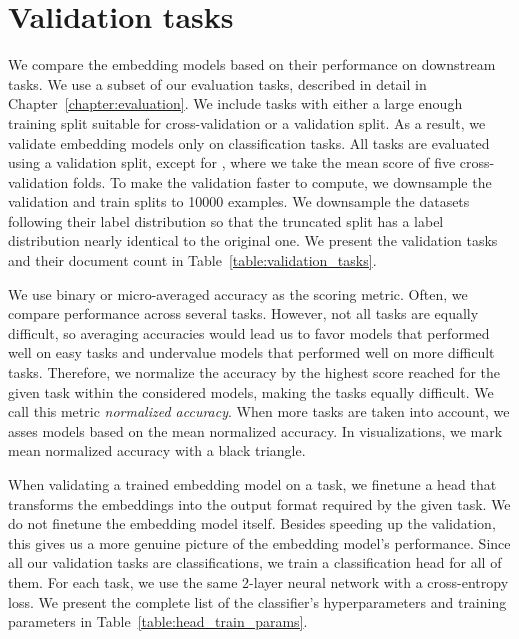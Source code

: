 \section{Validation tasks}\label{section:validation_tasks}

We compare the embedding models based on their performance on downstream tasks.
We use a subset of our evaluation tasks, described in detail in
Chapter~\ref{chapter:evaluation}. We include tasks with either a large enough
training split suitable for cross-validation or a validation split. As a
result, we validate embedding models only on classification tasks. All tasks
are evaluated using a validation split, except for , where we take
the mean score of five cross-validation folds. To make the validation faster to
compute, we downsample the validation and train splits to 10000 examples. We
downsample the datasets following their label distribution so that the
truncated split has a label distribution nearly identical to the original one.
We present the validation tasks and their document count in
Table~\ref{table:validation_tasks}.

We use binary or micro-averaged accuracy as the scoring metric. Often, we compare
performance across several tasks. However, not all tasks are equally difficult,
so averaging accuracies would lead us to favor models that performed well on
easy tasks and undervalue models that performed well on more difficult tasks.
Therefore, we normalize the accuracy by the highest score reached for the given
task within the considered models, making the tasks equally difficult. We call
this metric \emph{normalized accuracy}. When more tasks are taken into account,
we asses models based on the mean normalized accuracy. In visualizations, we
mark mean normalized accuracy with a black triangle.

When validating a trained embedding model on a task, we finetune a head that
transforms the embeddings into the output format required by the given task. We
do not finetune the embedding model itself. Besides speeding up the validation,
this gives us a more genuine picture of the embedding model's performance.
Since all our validation tasks are classifications, we train a classification
head for all of them. For each task, we use the same 2-layer neural network
with a cross-entropy loss. We present the complete list of the classifier's
hyperparameters and training parameters in Table~\ref{table:head_train_params}.

